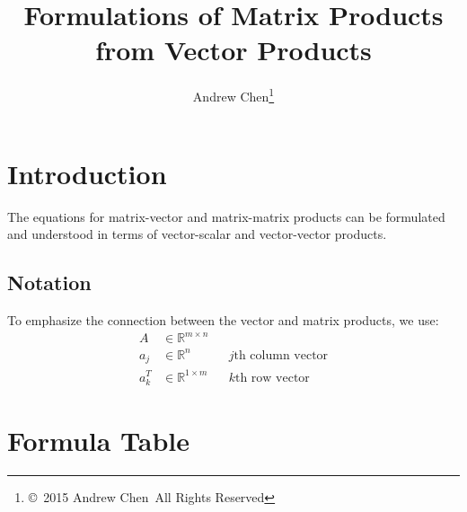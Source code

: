 \documentclass[letterpaper,12pt]{article}
\begin{document}
\title{Formulations of Matrix Products from Vector Products}
\author{Andrew Chen\footnote{\copyright\ 2015 Andrew Chen\    All Rights Reserved}}
\date{\vspace{-5ex}}
\maketitle

\section*{Introduction}
The equations for matrix-vector and matrix-matrix products can be formulated and understood in terms of vector-scalar and vector-vector products.

\subsection*{Notation}
To emphasize the connection between the vector and matrix products, we use:
\begin{align*}
A &\in \mathbb{R}^{m \times n} \\
a_j &\in \mathbb{R}^{n}        && j\text{th column vector} \\
a^T_k&\in \mathbb{R}^{1 \times m}     && k\text{th row vector}
\end{align*}

\section*{Formula Table}
\end{document}
